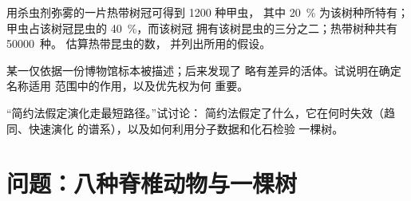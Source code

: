 \begin{exercise}[$\star\star\star$]\label{exo:b1:classifying-biodiversity:10}
用杀虫剂弥雾的一片热带树冠可得到 1200 种甲虫，
其中 \qty{20}{\%} 为该树种所特有；
甲虫占该树冠昆虫的 \qty{40}{\%}，而该树冠
拥有该树昆虫的三分之二；热带树种共有 \num{50000}~种。
估算热带昆虫的数，
并列出所用的假设。
\end{exercise}

\begin{exercise}[$\star\star\star$]\label{exo:b1:classifying-biodiversity:11}
某一仅依据一份博物馆标本被描述；后来发现了
略有差异的活体。试说明在确定名称适用
范围中的作用，以及优先权为何
重要。
\end{exercise}

\begin{exercise}[$\star\star\star$]\label{exo:b1:classifying-biodiversity:12}
“简约法假定演化走最短路径。”试讨论：
简约法假定了什么，它在何时失效（趋同、快速演化
的谱系），以及如何利用分子数据和化石检验
一棵树。
\end{exercise}

\section{问题：八种脊椎动物与一棵树}

